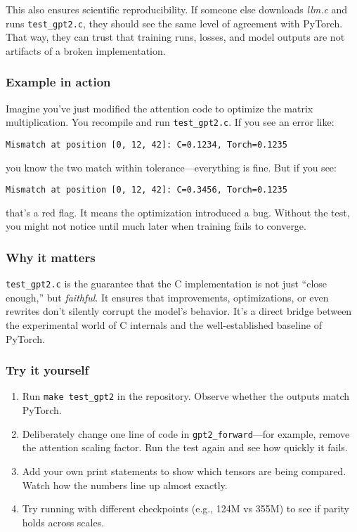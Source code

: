 \documentclass[
  letterpaper,
  DIV=11,
  numbers=noendperiod]{scrreprt}
\providecommand{\tightlist}{%
  \setlength{\itemsep}{0pt}\setlength{\parskip}{0pt}}
\begin{document}
This also ensures scientific reproducibility. If someone else downloads
\emph{llm.c} and runs \texttt{test\_gpt2.c}, they should see the same
level of agreement with PyTorch. That way, they can trust that training
runs, losses, and model outputs are not artifacts of a broken
implementation.

\subsubsection{Example in action}\label{example-in-action}

Imagine you've just modified the attention code to optimize the matrix
multiplication. You recompile and run \texttt{test\_gpt2.c}. If you see
an error like:

\begin{verbatim}
Mismatch at position [0, 12, 42]: C=0.1234, Torch=0.1235
\end{verbatim}

you know the two match within tolerance---everything is fine. But if you
see:

\begin{verbatim}
Mismatch at position [0, 12, 42]: C=0.3456, Torch=0.1235
\end{verbatim}

that's a red flag. It means the optimization introduced a bug. Without
the test, you might not notice until much later when training fails to
converge.

\subsubsection{Why it matters}\label{why-it-matters-32}

\texttt{test\_gpt2.c} is the guarantee that the C implementation is not
just ``close enough,'' but \emph{faithful}. It ensures that
improvements, optimizations, or even rewrites don't silently corrupt the
model's behavior. It's a direct bridge between the experimental world of
C internals and the well-established baseline of PyTorch.

\subsubsection{Try it yourself}\label{try-it-yourself-40}

\begin{enumerate}
\def\labelenumi{\arabic{enumi}.}
\tightlist
\item
  Run \texttt{make\ test\_gpt2} in the repository. Observe whether the
  outputs match PyTorch.
\item
  Deliberately change one line of code in \texttt{gpt2\_forward}---for
  example, remove the attention scaling factor. Run the test again and
  see how quickly it fails.
\item
  Add your own print statements to show which tensors are being
  compared. Watch how the numbers line up almost exactly.
\item
  Try running with different checkpoints (e.g., 124M vs 355M) to see if
  parity holds across scales.
\end{enumerate}
\end{document}
